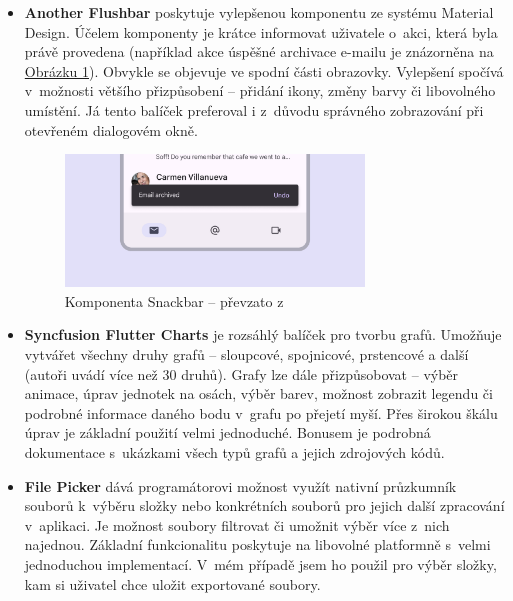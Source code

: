\documentclass[
  biblatex,
  figures=true,
  tables=false,
  glossaries,
  index
]{kidiplom}
\begin{document}
\begin{itemize}
  \item \textbf{Another Flushbar} \cite{flushbar} poskytuje vylepšenou komponentu  ze systému Material Design. Účelem komponenty je krátce informovat uživatele o~akci, která byla právě provedena (například akce úspěšné archivace e-mailu je znázorněna na \hyperref[fig:snackbar]{Obrázku \ref{fig:snackbar}}). Obvykle se objevuje ve spodní části obrazovky. Vylepšení spočívá v~možnosti většího přizpůsobení -- přidání ikony, změny barvy či libovolného umístění. Já tento balíček preferoval i z~důvodu správného zobrazování při otevřeném dialogovém okně.

  \begin{figure}
    \centering
    \includegraphics[width=0.75\textwidth]{images/snackbar.png}
    \caption{Komponenta Snackbar -- převzato z~\cite{m3-components}}
    \label{fig:snackbar}
  \end{figure}
      
  \item \textbf{Syncfusion Flutter Charts} \cite{syncfusion-charts} je rozsáhlý balíček pro tvorbu grafů. Umožňuje vytvářet všechny druhy grafů -- sloupcové, spojnicové, prstencové a další (autoři uvádí více než 30 druhů). Grafy lze dále přizpůsobovat -- výběr animace, úprav jednotek na osách, výběr barev, možnost zobrazit legendu či podrobné informace daného bodu v~grafu po přejetí myší. Přes širokou škálu úprav je základní použití velmi jednoduché. Bonusem je podrobná dokumentace s~ukázkami všech typů grafů a jejich zdrojových kódů.
  \item \textbf{File Picker} \cite{file-picker} dává programátorovi možnost využít nativní průzkumník souborů k~výběru složky nebo konkrétních souborů pro jejich další zpracování v~aplikaci. Je možnost soubory filtrovat či umožnit výběr více z~nich najednou. Základní funkcionalitu poskytuje na libovolné platformně s~velmi jednoduchou implementací. V~mém případě jsem ho použil pro výběr složky, kam si uživatel chce uložit exportované soubory. 
\end{itemize}
\end{document}
